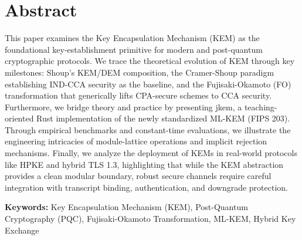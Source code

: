\chapter*{Abstract}
\vspace{1em}

This paper examines the Key Encapsulation Mechanism (KEM) as the foundational key-establishment primitive for modern and post-quantum cryptographic protocols. We trace the theoretical evolution of KEM through key milestones: Shoup's KEM/DEM composition, the Cramer-Shoup paradigm establishing IND-CCA security as the baseline, and the Fujisaki-Okamoto (FO) transformation that generically lifts CPA-secure schemes to CCA security. Furthermore, we bridge theory and practice by presenting jkem, a teaching-oriented Rust implementation of the newly standardized ML-KEM (FIPS 203). Through empirical benchmarks and constant-time evaluations, we illustrate the engineering intricacies of module-lattice operations and implicit rejection mechanisms. Finally, we analyze the deployment of KEMs in real-world protocols like HPKE and hybrid TLS 1.3, highlighting that while the KEM abstraction provides a clean modular boundary, robust secure channels require careful integration with transcript binding, authentication, and downgrade protection.\par

\vspace{1em}
\noindent\textbf{Keywords: }Key Encapsulation Mechanism (KEM), Post-Quantum Cryptography (PQC), Fujisaki-Okamoto Transformation, ML-KEM, Hybrid Key Exchange